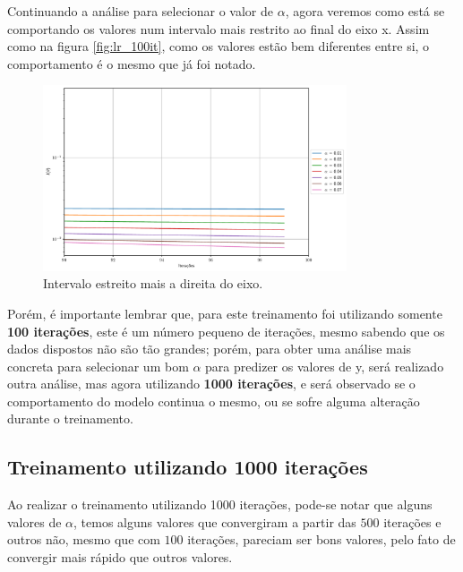 \documentclass[a4paper, 12pt]{article}
\begin{document}
Continuando a análise para selecionar o valor de $\alpha$, agora veremos como está se comportando os valores
num intervalo mais restrito ao final do eixo x. Assim como na figura \ref{fig:lr_100it}, como os valores estão
bem diferentes entre si, o comportamento é o mesmo que já foi notado.
\begin{figure}[!h]
    \centering
    \includegraphics[width=0.8\textwidth]{../imgs/higher_interval_100it.pdf}
    \caption{Intervalo estreito mais a direita do eixo.}
    \label{fig:higher_interval_100it}
\end{figure}

Porém, é importante lembrar que, para este treinamento foi utilizando somente \textbf{100 iterações}, este é um número
pequeno de iterações, mesmo sabendo que os dados dispostos não são tão grandes; porém, para obter uma análise
mais concreta para selecionar um bom $\alpha$ para predizer os valores de y, será realizado outra análise, mas agora
utilizando \textbf{1000 iterações}, e será observado se o comportamento do modelo continua o mesmo, ou se sofre alguma
alteração durante o treinamento.
\clearpage

\subsection{Treinamento utilizando 1000 iterações}

Ao realizar o treinamento utilizando 1000 iterações, pode-se notar que alguns valores de $\alpha$, 
temos alguns valores que convergiram a partir das $500$ iterações e outros não, mesmo que com $100$ iterações,
pareciam ser bons valores, pelo fato de convergir mais rápido que outros valores. 
\end{document}
